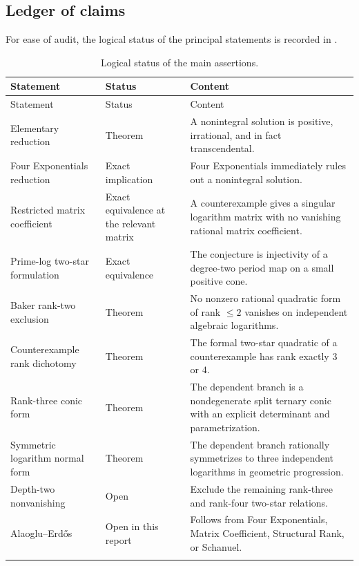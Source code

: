 \documentclass[11pt]{article}
\theoremstyle{definition}
\theoremstyle{remark}
\begin{document}
\subsection{Ledger of claims}

For ease of audit, the logical status of the principal statements is recorded in
.

\begin{longtable}{@{}p{}p{}p{}@{}}
\toprule
Statement & Status & Content \\
\midrule
\endfirsthead
\toprule
Statement & Status & Content \\
\midrule
\endhead
Elementary reduction & Theorem & A nonintegral solution is positive, irrational, and in fact transcendental. \\
Four Exponentials reduction & Exact implication & Four Exponentials immediately rules out a nonintegral solution. \\
Restricted matrix coefficient & Exact equivalence at the relevant matrix & A counterexample gives a singular logarithm matrix with no vanishing rational matrix coefficient. \\
Prime-log two-star formulation & Exact equivalence & The conjecture is injectivity of a degree-two period map on a small positive cone. \\
Baker rank-two exclusion & Theorem & No nonzero rational quadratic form of rank $\le 2$ vanishes on independent algebraic logarithms. \\
Counterexample rank dichotomy & Theorem & The formal two-star quadratic of a counterexample has rank exactly $3$ or $4$. \\
Rank-three conic form & Theorem & The dependent branch is a nondegenerate split ternary conic with an explicit determinant and parametrization. \\
Symmetric logarithm normal form & Theorem & The dependent branch rationally symmetrizes to three independent logarithms in geometric progression. \\
Depth-two nonvanishing & Open & Exclude the remaining rank-three and rank-four two-star relations. \\
Alaoglu--Erd\H{o}s & Open in this report & Follows from Four Exponentials, Matrix Coefficient, Structural Rank, or Schanuel. \\
\bottomrule
\caption{Logical status of the main assertions.}
\label{tab:ledger}
\end{longtable}
\end{document}
